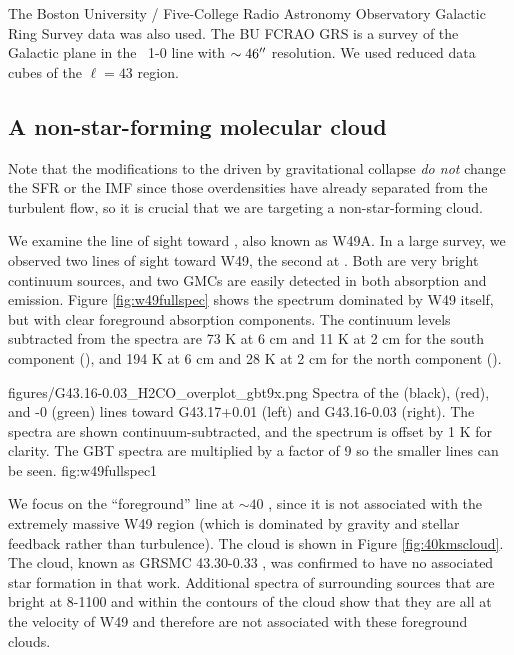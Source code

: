 The Boston University / Five-College Radio Astronomy Observatory Galactic Ring
Survey \thirteenco data was also used.  The BU FCRAO GRS \citep{Jackson2006a}
is a survey of the Galactic plane in the \thirteenco\ 1-0 line with $\sim
46\mbox{$^{\prime\prime}$}$ resolution.  We used reduced data cubes of the $\ell=43$ region.

\subsection{\GRSMC A non-star-forming molecular cloud}



Note that the modifications to the \rhoPDF driven by gravitational collapse
\emph{do not} change the SFR or the IMF since those overdensities have already
separated from the turbulent flow, so it is crucial that we are targeting a
non-star-forming cloud.  

We examine the line of sight toward \north, also known as W49A.  In a 
large survey, we observed two lines of sight toward W49, the second at
\south.  Both are very bright continuum sources, and two GMCs are easily
detected in both \formaldehyde absorption and \thirteenco emission.  Figure
\ref{fig:w49fullspec} shows the spectrum dominated by W49 itself, but with
clear foreground absorption components.  The continuum levels subtracted from the spectra
are 73 K at 6 cm and 11 K at 2 cm for the south component (\south), and 194 K at 6 cm
and 28 K at 2 cm for the north component (\north).


          {figures/G43.16-0.03_H2CO_overplot_gbt9x.png}
{Spectra of the \formaldehyde \oneone (black), \twotwo (red), and -0 (green) lines toward G43.17+0.01 (left) and G43.16-0.03 (right).
The \formaldehyde spectra are shown continuum-subtracted, and the \thirteenco
spectrum is offset by 1 K for clarity.  The GBT \twotwo spectra are multiplied
by a factor of 9 so the smaller lines can be seen.  
}{fig:w49fullspec}{1}

We focus on the ``foreground'' line at $\sim40$ \kms, since it is not
associated with the extremely massive W49 region (which is dominated by gravity
and stellar feedback rather than turbulence).  The cloud is shown in Figure
\ref{fig:40kmscloud}.  The cloud, known as GRSMC 43.30-0.33 \citep{Simon2001a},
was confirmed to have no associated star formation in that work.  Additional
\formaldehyde spectra of surrounding sources that are bright at 8-1100 \um and
within the \thirteenco contours of the cloud show that they are all at the
velocity of W49 and therefore are not associated with these foreground clouds.  

